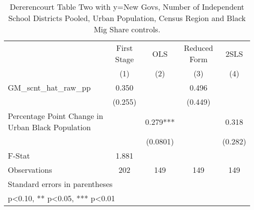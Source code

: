 \begin{table}[htbp]\centering
\def\sym#1{\ifmmode^{#1}\else\(^{#1}\)\fi}
\caption{Dererencourt Table Two with y=New Govs, Number of Independent School Districts Pooled, Urban Population, Census Region and Black Mig Share controls.}
\begin{tabular}{l*{4}{c}}
\toprule
                    & First Stage   &         OLS   &Reduced Form   &        2SLS   \\
                    &\multicolumn{1}{c}{(1)}   &\multicolumn{1}{c}{(2)}   &\multicolumn{1}{c}{(3)}   &\multicolumn{1}{c}{(4)}   \\
\midrule
GM\_scnt\_hat\_raw\_pp  &       0.350   &               &       0.496   &               \\
                    &     (0.255)   &               &     (0.449)   &               \\
\addlinespace
Percentage Point Change in Urban Black Population&               &       0.279***&               &       0.318   \\
                    &               &    (0.0801)   &               &     (0.282)   \\
\midrule
F-Stat              &       1.881   &               &               &               \\
Observations        &         202   &         149   &         149   &         149   \\
\bottomrule
\multicolumn{5}{l}{\footnotesize Standard errors in parentheses}\\
\multicolumn{5}{l}{\footnotesize * p<0.10, ** p<0.05, *** p<0.01}\\
\end{tabular}
\end{table}
